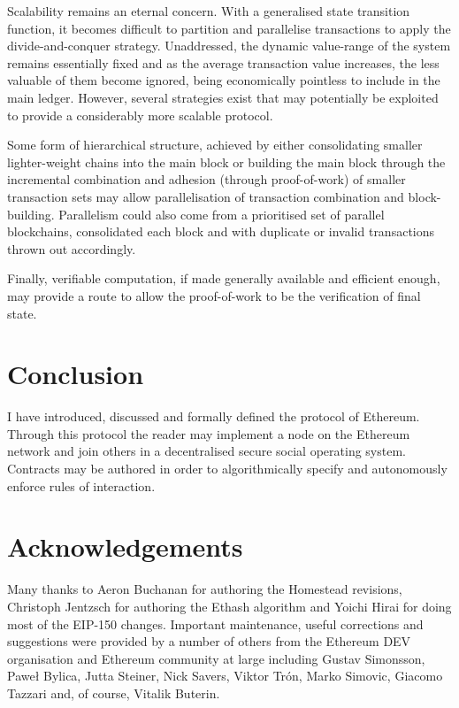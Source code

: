 \documentclass[9pt,oneside]{amsart}
\begin{document}
\begin{multicols}{2}
Scalability remains an eternal concern. With a generalised state transition function, it becomes difficult to partition and parallelise transactions to apply the divide-and-conquer strategy. Unaddressed, the dynamic value-range of the system remains essentially fixed and as the average transaction value increases, the less valuable of them become ignored, being economically pointless to include in the main ledger. However, several strategies exist that may potentially be exploited to provide a considerably more scalable protocol.

Some form of hierarchical structure, achieved by either consolidating smaller lighter-weight chains into the main block or building the main block through the incremental combination and adhesion (through proof-of-work) of smaller transaction sets may allow parallelisation of transaction combination and block-building. Parallelism could also come from a prioritised set of parallel blockchains, consolidated each block and with duplicate or invalid transactions thrown out accordingly.

Finally, verifiable computation, if made generally available and efficient enough, may provide a route to allow the proof-of-work to be the verification of final state.

\section{Conclusion} \label{ch:conclusion}

I have introduced, discussed and formally defined the protocol of Ethereum. Through this protocol the reader may implement a node on the Ethereum network and join others in a decentralised secure social operating system. Contracts may be authored in order to algorithmically specify and autonomously enforce rules of interaction.

\section{Acknowledgements}

Many thanks to Aeron Buchanan for authoring the Homestead revisions, Christoph Jentzsch for authoring the Ethash algorithm and Yoichi Hirai for doing most of the EIP-150 changes. Important maintenance, useful corrections and suggestions were provided by a number of others from the Ethereum DEV organisation and Ethereum community at large including Gustav Simonsson, Pawe\l{} Bylica, Jutta Steiner, Nick Savers, Viktor Tr\'{o}n, Marko Simovic, Giacomo Tazzari and, of course, Vitalik Buterin.




\end{multicols}
\end{document}
